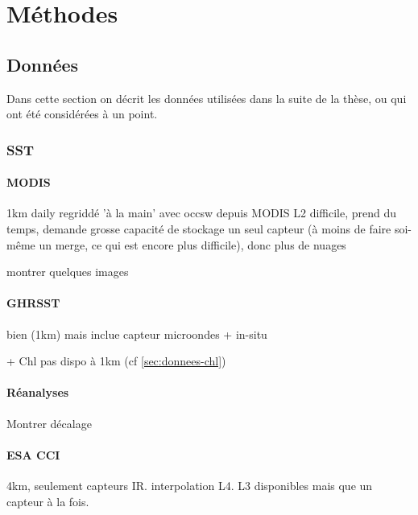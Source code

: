 \documentclass[index]{subfiles}
\begin{document}
\chapter{Méthodes}
\label{chp:methodes}

\tocsubfile

\section{Données}
\label{sec:donnees}

Dans cette section on décrit les données utilisées dans la suite de la thèse, ou qui ont été considérées à un point.

\subsection{SST}
\label{sec:donnees-sst}

\subsubsection{MODIS}
\label{sec:donnees-sst-modis}

1km daily
regriddé 'à la main' avec occsw depuis MODIS L2
difficile, prend du temps, demande grosse capacité de stockage
un seul capteur (à moins de faire soi-même un merge, ce qui est encore plus difficile), donc plus de nuages

montrer quelques images

\subsubsection{GHRSST}
\label{sec:donnees-sst-ghrsst}
bien (1km) mais inclue capteur microondes + in-situ

+ Chl pas dispo à 1km
(cf \cref{sec:donnees-chl})

\subsubsection{Réanalyses}
\label{sec:donnees-sst-reanalyses}

Montrer décalage

\subsubsection{ESA CCI}
\label{sec:donnees-sst-esacci}

4km, seulement capteurs IR.
interpolation L4.
L3 disponibles mais que un capteur à la fois.
\end{document}
